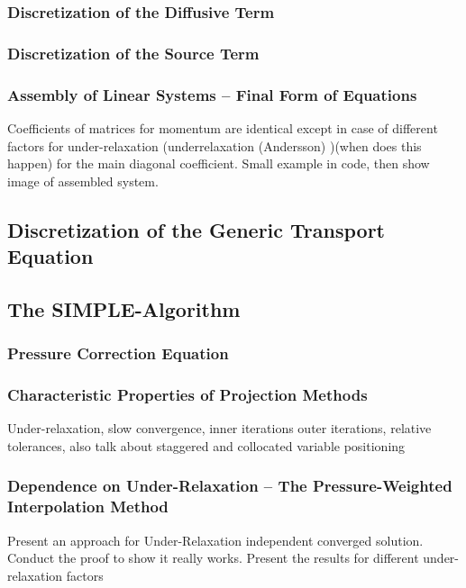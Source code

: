       \subsubsection{Discretization of the Diffusive Term}

      \subsubsection{Discretization of the Source Term}

      \subsubsection{Assembly of Linear Systems -- Final Form of Equations}
        Coefficients of matrices for momentum are identical except in case of different factors for under-relaxation (underrelaxation (Andersson) )(when does this happen) for the main diagonal coefficient. Small example in code, then show image of assembled system.

    \subsection{Discretization of the Generic Transport Equation}

    \subsection{The SIMPLE-Algorithm}
      
      \subsubsection{Pressure Correction Equation}

      \subsubsection{Characteristic Properties of Projection Methods}

        Under-relaxation, slow convergence, inner iterations outer iterations, relative tolerances, also talk about staggered and collocated variable positioning

      \subsubsection{Dependence on Under-Relaxation -- The Pressure-Weighted Interpolation Method}

        Present an approach for Under-Relaxation independent converged solution. Conduct the proof to show it really works. Present the results for different under-relaxation factors

